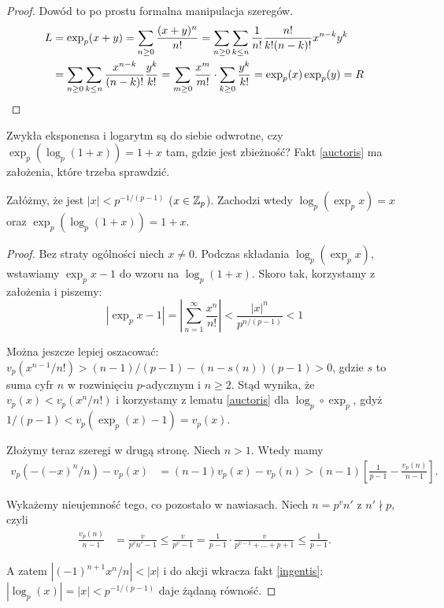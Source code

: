 \begin{proof}
	Dowód to po prostu formalna manipulacja szeregów.
	\begin{align*}
		L & = \exp_p(x+y) = \sum_{n \ge 0} \frac{(x+y)^n}{n!} 
		 = \sum_{n \ge 0} \sum_{k \le n} \frac{1}{n!} \frac{n!}{k!(n-k)!} x^{n-k}y^k \\
		& = \sum_{n \ge 0} \sum_{k \le n} \frac{x^{n-k}}{(n-k)!} \frac{y^k}{k!} = \sum_{m \ge 0} \frac{x^m}{m!} \cdot \sum_{k \ge 0} \frac{y^k}{k!} = \exp_p(x) \exp_p(y) = R\qedhere
	\end{align*}
\end{proof}

Zwykła eksponensa i logarytm są do siebie odwrotne, czy $\exp_p(\log_p(1+x)) = 1+x$ tam, gdzie jest zbieżność?
Fakt \ref{auctoris} ma założenia, które trzeba sprawdzić.

\begin{fakt}
	Załóżmy, że jest $|x| < p^{-1/(p-1)}$ ($x \in \mathbb Z_p$). Zachodzi wtedy $\log_p (\exp_p x) = x$ oraz $\exp_p(\log_p (1+x)) = 1 + x$.
\end{fakt}

\begin{proof}
	Bez straty ogólności niech $x \neq 0$.
	Podczas składania $\log_p(\exp_p x)$, wstawiamy $\exp_p x - 1$ do wzoru na $\log_p (1 + x)$.
	Skoro tak, korzystamy z założenia i piszemy:
	\[
		|\exp_p x - 1| = \left|\sum_{n=1}^\infty \frac {x^n}{n!} \right| < \frac{|x|^n}{p^{n / (p-1)}} < 1
	\]

	Można jeszcze lepiej oszacować: $v_p(x^{n-1} / n!) > (n-1)/(p-1) - (n-s(n))(p-1) > 0$, gdzie $s$ to suma cyfr $n$ w rozwinięciu $p$-adycznym i $n \ge 2$.
	Stąd wynika, że $v_p(x) < v_p(x^n / n!)$ i korzystamy z lematu \ref{auctoris} dla $\log_p \circ \exp_p$, gdyż $1/(p-1) < v_p(\exp_p(x) - 1) = v_p(x)$. %

	Złożymy teraz szeregi w drugą stronę.
	Niech $n > 1$. 
	Wtedy mamy
	\begin{align*}
		v_p(-(-x)^n/n) - v_p(x) & = (n-1) v_p(x) - v_p(n) > (n-1) \left[ \frac{1}{p-1} - \frac{v_p(n)}{n-1}\right].
	\end{align*}

	Wykażemy nieujemność tego, co pozostało w nawiasach.
	Niech $n = p^v n'$ z $n ' \nmid p$, czyli
	\begin{align*}
		\frac{v_p(n)}{n-1} & = \frac{v}{p^v n' -1 } \le \frac{v}{p^v - 1}  = \frac{1}{p-1} \cdot \frac{v}{p^{v-1} + \ldots + p + 1} \le \frac{1}{p-1}.
	\end{align*}

	A zatem $|(-1)^{n+1} x^n/n| < |x|$ i do akcji wkracza fakt \ref{ingentis}: $|\log_p(x)| = |x| < p^{-1/(p-1)}$ daje żądaną równość.
\end{proof}

